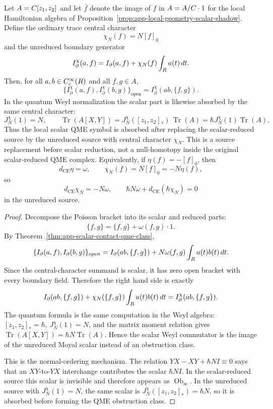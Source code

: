 \begin{thm}
\label{thm:app-central-character-qme-cancellation}
  Let \(A=C[z_1,z_2]\) and let
  \(\bar f\) denote the image of \(f\) in
  \(A=A/C\cdot1\) for the local Hamiltonian algebra of
  Proposition~\ref{prop:app-local-geometry-scalar-shadow}.  Define the
  ordinary trace central character
  \[
    \chi_N(f)=N[f]_0
  \]
  and the unreduced boundary generator
  \[
    I^\chi_\partial(a,f)
      =I_\partial(a,f)+\chi_N(f)\int_{R} a(t)\,dt .
  \]
  Then, for all \(a,b\in C_c^\infty(R)\) and all
  \(f,g\in A\),
  \[
    \{I^\chi_\partial(a,f),I^\chi_\partial(b,g)\}_{\mathrm{open}}
      =
    I^\chi_\partial(ab,\{f,g\}).
  \]
  In the quantum Weyl normalization the scalar part is likewise
  absorbed by the same central character:
  \[
    J^\chi_N(1)=N,\qquad
    \operatorname{Tr}(A[X,Y])
      =J^\chi_N([z_1,z_2]_{*})\,\operatorname{Tr}(A)
      =\hbar J^\chi_N(1)\operatorname{Tr}(A).
  \]
  Thus the local scalar QME symbol is absorbed after replacing the
  scalar-reduced source by the unreduced source with central character
  \(\chi_N\).  This is a source replacement before scalar reduction, not a
  null-homotopy inside the original scalar-reduced QME complex.
  Equivalently, if \(\eta(f)=-[f]_0\), then
  \[
    d_{\mathrm{CE}}\eta=\omega,\qquad
    \chi_N(f)=N[f]_0=-N\eta(f),
  \]
  so
  \[
    d_{\mathrm{CE}}\chi_N=-N\omega,\qquad
    \hbar N\omega+d_{\mathrm{CE}}(\hbar\chi_N)=0
  \]
  in the unreduced source.
\end{thm}

\begin{proof}
  Decompose the Poisson bracket into its scalar and reduced parts:
  \[
    \{f,g\}=\overline{\{f,g\}}+\omega(f,g)\cdot1 .
  \]
  By Theorem~\ref{thm:app-scalar-contact-qme-class},
  \[
    \{I_\partial(a,f),I_\partial(b,g)\}_{open}
      =
    I_\partial(ab,\{f,g\})
      +N\omega(f,g)\int_{R} a(t)b(t)\,dt .
  \]
  Since the central-character summand is scalar, it has zero open
  bracket with every boundary field.  Therefore the right hand side is
  exactly
  \[
    I_\partial(ab,\{f,g\})
    +\chi_N(\{f,g\})\int_{R} a(t)b(t)\,dt
    =
    I^\chi_\partial(ab,\{f,g\}).
  \]
  The quantum formula is the same computation in the Weyl algebra:
  \([z_1,z_2]_{*}=\hbar\), \(J^\chi_N(1)=N\), and the matrix moment
  relation gives
  \(\operatorname{Tr}(A[X,Y])=\hbar N\operatorname{Tr}(A)\).  Hence the
  scalar Weyl commutator is the image of the unreduced Moyal scalar
  instead of an obstruction class.

  This is the normal-ordering mechanism.  The relation
  \(YX-XY+\hbar N I\equiv0\) says that an \(XY\)-to-\(YX\) interchange
  contributes the scalar \(\hbar N I\).  In the scalar-reduced source
  this scalar is invisible and therefore appears as
  \(\operatorname{Ob}_{\mathrm{sc}}\).  In the unreduced source with
  \(J_N^\chi(1)=N\), the same scalar is
  \(J_N^\chi([z_1,z_2]_*)=\hbar N\), so it is absorbed before forming
  the QME obstruction class.
\end{proof}

